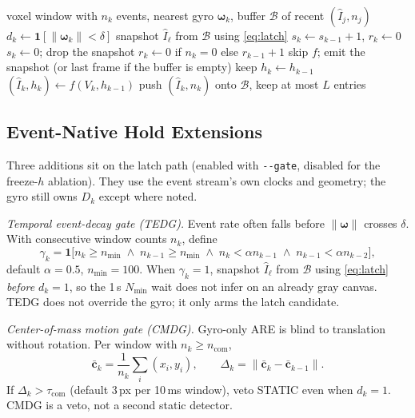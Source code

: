 \documentclass[journal]{IEEEtran}
\DeclareRobustCommand{\norm}[1]{\lVert #1 \rVert}
\begin{document}
\begin{algorithm}[!t]
\caption{Fade-horizon latch (released default).}
\label{alg:latch}
\begin{algorithmic}[1]
\Require voxel window with \(n_k\) events, nearest gyro \(\boldsymbol{\omega}_k\),
buffer \(\mathcal{B}\) of recent \((\hat{I}_j, n_j)\)
\State \(d_k \gets \mathbf{1}[\norm{\boldsymbol{\omega}_k} < \delta]\)
   snapshot \(\hat{I}_{\ell}\) from \(\mathcal{B}\) using \eqref{eq:latch}
  \EndIf
  \State \(s_k \gets s_{k-1}+1\),\; \(r_k \gets 0\)
\Else
  \State \(s_k \gets 0\); drop the snapshot
  \State \(r_k \gets 0\) if \(n_k=0\) else \(r_{k-1}+1\)
\EndIf
{}
  \State skip \(f\); emit the snapshot (or last frame if the buffer is empty)
  \State keep \(h_k \gets h_{k-1}\)
\Else
  \State \((\hat{I}_k, h_k) \gets f(V_k, h_{k-1})\)
  \State push \((\hat{I}_k, n_k)\) onto \(\mathcal{B}\), keep at most \(L\) entries
\EndIf
\end{algorithmic}
\end{algorithm}

\subsection{Event-Native Hold Extensions}
\label{sec:extensions}
Three additions sit on the latch path (enabled with \texttt{-{}-gate}, disabled
for the freeze-\(h\) ablation). They use the event stream's own clocks and
geometry; the gyro still owns \(D_k\) except where noted.

\textit{Temporal event-decay gate (TEDG).} Event rate often falls before
\(\norm{\boldsymbol{\omega}}\) crosses \(\delta\). With consecutive window
counts \(n_k\), define
\begin{equation}
\label{eq:tedg}
\gamma_k = \mathbf{1}\bigl[n_k \ge n_{\min}\;\wedge\;
n_{k-1} \ge n_{\min}\;\wedge\;
n_k < \alpha n_{k-1}\;\wedge\;
n_{k-1} < \alpha n_{k-2}\bigr],
\end{equation}
default \(\alpha=0.5\), \(n_{\min}=100\). When \(\gamma_k=1\), snapshot
\(\hat{I}_{\ell}\) from \(\mathcal{B}\) using \eqref{eq:latch} \emph{before}
\(d_k=1\), so the 1\,s \(N_{\min}\) wait does not infer on an already gray
canvas. TEDG does not override the gyro; it only arms the latch candidate.

\textit{Center-of-mass motion gate (CMDG).} Gyro-only ARE is blind to
translation without rotation. Per window with \(n_k \ge n_{\mathrm{com}}\),
\begin{equation}
\label{eq:cmdg}
\bar{\mathbf{c}}_k = \frac{1}{n_k}\sum_i (x_i, y_i),
\qquad
\Delta_k = \norm{\bar{\mathbf{c}}_k - \bar{\mathbf{c}}_{k-1}}.
\end{equation}
If \(\Delta_k > \tau_{\mathrm{com}}\) (default 3\,px per 10\,ms window), veto
STATIC even when \(d_k=1\). CMDG is a veto, not a second static detector.
\end{document}
